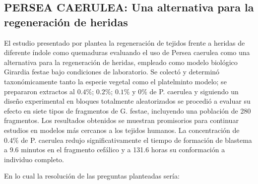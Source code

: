 \subsection{PERSEA CAERULEA: Una alternativa para la regeneración de heridas}

El estudio presentado por \cite{soto2023persea} plantea la regeneración de tejidos frente a heridas de diferente índole como quemaduras evaluando el uso de Persea caerulea como una alternativa para la regeneración de heridas, empleado como modelo biológico Girardia festae bajo condiciones de laboratorio. Se colectó y determinó taxonómicamente tanto la especie vegetal como el platelminto modelo; se prepararon extractos al $0.4\%$; $0.2\%$; $0.1\%$ y $0\%$ de P. caerulea y siguiendo un diseño experimental en bloques totalmente aleatorizados se procedió a evaluar su efecto en siete tipos de fragmentos de G. festae, incluyendo una población de 280 fragmentos. Los resultados obtenidos se muestran promisorios para continuar estudios en modelos más cercanos a los tejidos humanos. La concentración de $0.4\%$ de P. caerulea redujo significativamente el tiempo de formación de blastema a 9.6 minutos en el fragmento cefálico y a 131.6 horas su conformación a individuo completo.

En lo cual la resolución de las preguntas planteadas sería:


